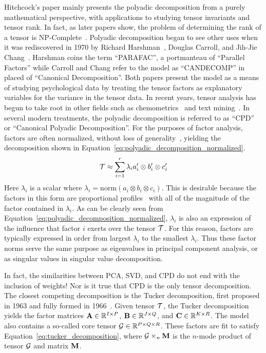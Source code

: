 \documentclass[../dissertation.tex]{subfiles}
\begin{document}
Hitchcock's paper mainly presents the polyadic decomposition from a
purely mathematical perspective, with applications to studying tensor
invariants and tensor rank.  In fact, as later papers show, the
problem of determining the rank of a tensor is
NP-Complete~\cite{haastad1990}.  Polyadic decomposition began to see
other uses when it was rediscovered in 1970 by Richard
Harshman~\cite{harshman1970}, Douglas Carroll, and Jih-Jie
Chang~\cite{carroll1970}.  Harshman coins the term ``PARAFAC'', a
portmanteau of ``Parallel Factors'' while Carroll and Chang refer to
the model as ``CANDECOMP'' in placed of ``Canonical Decomposition''.
Both papers present the model as a means of studying psychological
data by treating the tensor factors as explanatory variables for the
variance in the tensor data.  In recent years, tensor analysis has
begun to take root in other fields such as chemometrics~\cite{bro1997}
and text mining~\cite{bader2007}.  In several modern treatments, the
polyadic decomposition is referred to as ``CPD'' or ``Canonical
Polyadic Decomposition''.  For the purposes of factor analysis,
factors are often normalized, without loss of
generality~\cite{bro1997, bader2007}, yielding the decomposition shown
in Equation~\ref{eq:polyadic_decomposition_normalized}.
\begin{equation} \label{eq:polyadic_decomposition_normalized}
  \mathcal{T} \approx \displaystyle\sum_{i=1}^{r} \lambda_i a'_i
  \otimes b'_i \otimes c'_i
\end{equation}
Here $\lambda_i$ is a scalar where $\lambda_i = \mathrm{norm}(a_i
\otimes b_i \otimes c_i)$.  This is desirable because the factors in
this form are proportional profiles~\cite{harshman1970} with all of
the magnitude of the factor contained in $\lambda_i$.  As can be
clearly seen from Equation~\ref{eq:polyadic_decomposition_normalized},
$\lambda_i$ is also an expression of the influence that factor $i$
exerts over the tensor $\mathcal{T}$.  For this reason, factors are
typically expressed in order from largest $\lambda_i$ to the smallest
$\lambda_i$.  Thus these factor norms serve the same purpose as
eigenvalues in principal component analysis, or as singular values in
singular value decomposition.

In fact, the similarities between PCA, SVD, and CPD do not end with
the inclusion of weights!  Nor is it true that CPD is the only tensor
decomposition.  The closest competing decomposition is the Tucker
decomposition, first proposed in 1963 and fully formed in
1966~\cite{kolda2009}.  Given tensor $\mathcal{T}$, the Tucker
decomposition yields the factor matrices $\mathrm{\bf 
  A}\in\mathbb{R}^{I\times P}$, $\mathrm{\bf  B} \in
\mathbb{R}^{J\times Q}$, and $\mathrm{\bf  C}\in
\mathbb{R}^{K\times R}$.  The model also contains a so-called core
tensor $\mathcal{G} \in \mathbb{R}^{P\times Q \times R}$.  These
factors are fit to satisfy Equation~\ref{eq:tucker_decomposition},
where $\mathcal{G} \times_n \mathrm{\bf M}$ is the $n$-mode product of
tensor $\mathcal{G}$ and matrix $\mathrm{\bf M}$.  
\end{document}
